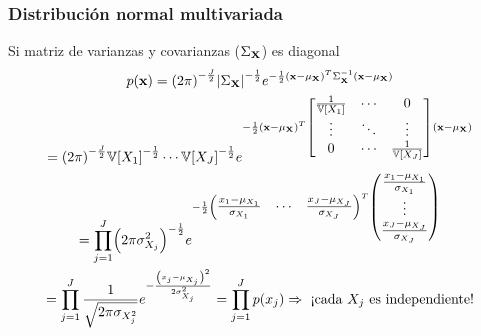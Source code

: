 \documentclass[table]{beamer}
\begin{document}
\begin{frame}
    \frametitle{Distribución normal multivariada}
    \begin{block}{Si matriz de varianzas y covarianzas ($\Sigma_{\mathbf{X}}$) es diagonal}
        \begin{multline*}
            \pdf{\xvec}
            = \parens{2 \pi}^{- \frac{J}{2}} \vparens{\Sigma_{\Xvec}}^{- \frac{1}{2}}
            e^{- \frac{1}{2} \parens{\xvec - \mu_{\Xvec}}^{T} \Sigma_{\Xvec}^{-1} \parens{\xvec - \mu_{\Xvec}}}
            \\
            = \parens{2 \pi}^{- \frac{J}{2}} \variance{X_{1}}^{- \frac{1}{2}}
            \cdots \variance{X_{J}}^{- \frac{1}{2}}
            e^{- \frac{1}{2} \parens{\xvec - \mu_{\Xvec}}^{T} \begin{bmatrix} \frac{1}{\variance{X_{1}}} & \cdots & 0 \\ \vdots & \ddots & \vdots \\ 0 & \cdots & \frac{1}{\variance{X_{J}}} \end{bmatrix} \parens{\xvec - \mu_{\Xvec}}}
            \\
            = \prod_{j = 1}^{J} \parens{2 \pi \sigma_{X_{j}}^{2}}^{- \frac{1}{2}}
            e^{- \frac{1}{2}
            \begin{pmatrix} \frac{x_{1} - \mu_{X_{1}}}{\sigma_{X_{1}}} & \cdots & \frac{x_{J} - \mu_{X_{J}}}{\sigma_{X_{J}}} \end{pmatrix}^{T}
                \begin{pmatrix} \frac{x_{1} - \mu_{X_{1}}}{\sigma_{X_{1}}} \\ \vdots \\ \frac{x_{J} - \mu_{X_{J}}}{\sigma_{X_{J}}} \end{pmatrix}}
            \\
            = \prod_{j = 1}^{J} \frac{1}{\sqrt{2 \pi \sigma_{X_{j}^{2}}}}
            e^{- \frac{\parens{x_{j} - \mu_{X_{j}}}^{2}}{2 \sigma_{X_{j}}^{2}}}
            = \prod_{j = 1}^{J} \pdf{x_{j}}
            \Rightarrow
            \text{ ¡cada } X_{j} \text{ es independiente!}
        \end{multline*}
    \end{block}
\end{frame}
\end{document}
